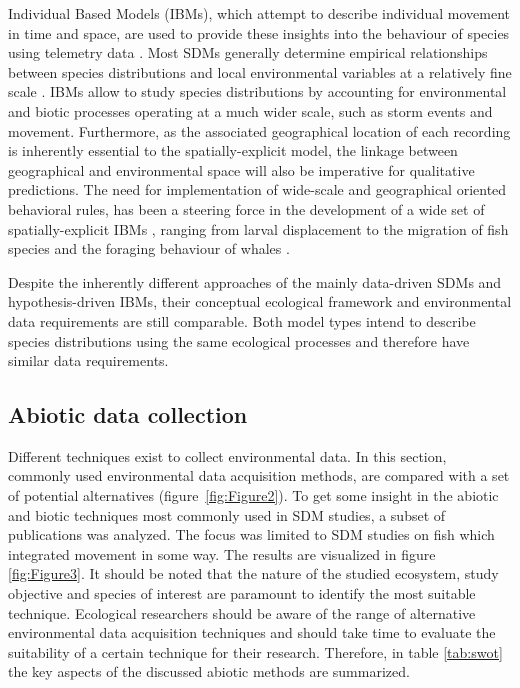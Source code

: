 \documentclass[12pt,authoryear]{elsarticle}
\begin{document}
\vspace{5mm}

Individual Based Models (IBMs), which attempt to describe individual movement in time and space, are used to provide these insights into the behaviour of species using telemetry data \citep{Bauer2013}. Most SDMs generally determine empirical relationships between species distributions and local environmental variables at a relatively fine scale \citep{Hayes2009}. IBMs allow to study species distributions by accounting for environmental and biotic processes operating at a much wider scale, such as storm events and movement. Furthermore, as the associated geographical location of each recording is inherently essential to the spatially-explicit model, the linkage between geographical and environmental space will also be imperative for qualitative predictions. The need for implementation of wide-scale and geographical oriented behavioral rules, has been a steering force in the development of a wide set of spatially-explicit IBMs \citep{Railsback2013,Grimm2005}, ranging from larval displacement \citep{Daewel2008} to the migration of fish species \citep{Baetens2013,Papastamatiou2013,Pauwels2014} and the foraging behaviour of whales \citep{Dillon2014}. 

Despite the inherently different approaches of the mainly data-driven SDMs and hypothesis-driven IBMs, their conceptual ecological framework and environmental data requirements are still comparable. Both model types intend to describe species distributions using the same ecological processes and therefore have similar data requirements. 

\subsection{Abiotic data collection }

Different techniques exist to collect environmental data. In this section, commonly used environmental data acquisition methods, are compared with a set of potential alternatives (figure~\ref{fig:Figure2}). To get some insight in the abiotic and biotic techniques most commonly used in SDM studies, a subset of publications was analyzed. The focus was limited to SDM studies on fish which integrated movement in some way. The results are visualized in figure \ref{fig:Figure3}. It should be noted that the nature of the studied ecosystem, study objective and species of interest are paramount to identify the most suitable technique. Ecological researchers should be aware of the range of alternative environmental data acquisition techniques and should take time to evaluate the suitability of a certain technique for their research. Therefore, in table \ref{tab:swot} the key aspects of the discussed abiotic methods are summarized.
\end{document}
